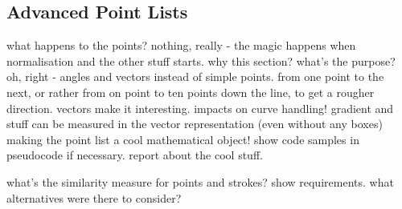 







\subsection{Advanced Point Lists}
\label{sec:hwre:advancedpointlists}

what happens to the points?
nothing, really - the magic happens when normalisation and the other stuff
starts.
why this section? what's the purpose? oh, right - angles and vectors instead
of simple points. from one point to the next, or rather from on point to
ten points down the line, to get a rougher direction.
vectors make it interesting. 
impacts on curve handling! gradient and stuff can be measured in the 
vector representation (even without any boxes)
making the point list a cool mathematical object!
show code samples in pseudocode if necessary.
report about the cool stuff.

what's the similarity measure for
points and strokes?
show requirements.
what alternatives were there to consider?

